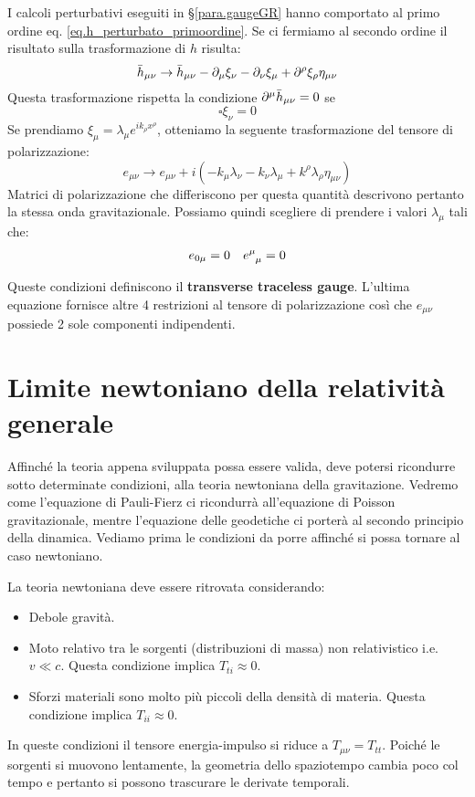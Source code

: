 I calcoli perturbativi eseguiti in \S\ref{para.gaugeGR} hanno comportato al primo ordine eq. \ref{eq.h_perturbato_primoordine}. Se ci fermiamo al secondo ordine il risultato sulla trasformazione di $h$ risulta:
\begin{equation*}
    \Bar{h}_{\mu\nu} \rightarrow \Bar{h}_{\mu\nu} - \partial_\mu \xi_\nu - \partial_\nu \xi_\mu + \partial^\rho \xi_\rho \eta_{\mu\nu}
\end{equation*}
Questa trasformazione rispetta la condizione $\partial^\mu \Bar{h}_{\mu\nu} = 0$ se
\begin{equation*}
    \square \xi_\nu = 0
\end{equation*}
Se prendiamo $\xi_\mu = \lambda_\mu e^{ik_\rho x^\rho}$, otteniamo la seguente trasformazione del tensore di polarizzazione:
\begin{equation*}
    e_{\mu\nu} \rightarrow e_{\mu\nu} + i(-k_\mu \lambda_\nu - k_\nu\lambda_\mu + k^\rho \lambda_\rho \eta_{\mu\nu})
\end{equation*}
Matrici di polarizzazione che differiscono per questa quantità descrivono pertanto la stessa onda gravitazionale. Possiamo quindi scegliere di prendere i valori $\lambda_\mu$ tali che:
\begin{align*}
    e_{0\mu} = 0 && \tensor{e}{^\mu_\mu}=0
\end{align*}

Queste condizioni definiscono il \textbf{transverse traceless gauge}. L'ultima equazione fornisce altre 4 restrizioni al tensore di polarizzazione così che $e_{\mu\nu}$ possiede 2 sole componenti indipendenti.
\section{Limite newtoniano della relatività generale}\label{para.limitenewton}
Affinché la teoria appena sviluppata possa essere valida, deve potersi ricondurre sotto determinate condizioni, alla teoria newtoniana della gravitazione. Vedremo come l'equazione di Pauli-Fierz ci ricondurrà all'equazione di Poisson gravitazionale, mentre l'equazione delle geodetiche ci porterà al secondo principio della dinamica. Vediamo prima le condizioni da porre affinché si possa tornare al caso newtoniano.

La teoria newtoniana deve essere ritrovata considerando:
\begin{itemize}
    \item Debole gravità.
    \item Moto relativo tra le sorgenti (distribuzioni di massa) non relativistico i.e. $v \ll c$. Questa condizione implica $T_{ti} \approx 0$.
    \item Sforzi materiali sono molto più piccoli della densità di materia. Questa condizione implica $T_{ii} \approx 0$.
\end{itemize}
In queste condizioni il tensore energia-impulso si riduce a $T_{\mu\nu}=T_{tt}$.
Poiché le sorgenti si muovono lentamente, la geometria dello spaziotempo cambia poco col tempo e pertanto si possono trascurare le derivate temporali.

